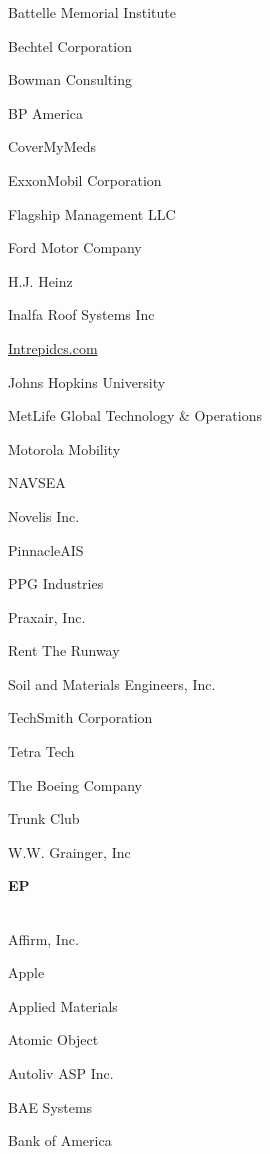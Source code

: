 \documentclass[twoside]{article}
\begin{document}
\begin{center}
\begin{multicols}{5}
\begin{FlushLeft}
\begin{compactitem}
\item Battelle Memorial Institute
\item Bechtel Corporation
\item Bowman Consulting
\item BP America
\item CoverMyMeds
\item ExxonMobil Corporation
\item Flagship Management LLC
\item Ford Motor Company
\item H.J. Heinz
\item Inalfa Roof Systems Inc
\item \url{Intrepidcs.com}
\item Johns Hopkins University
\item MetLife Global Technology \& Operations
\item Motorola Mobility
\item NAVSEA
\item Novelis Inc.
\item PinnacleAIS
\item PPG Industries
\item Praxair, Inc.
\item Rent The Runway
\item Soil and Materials Engineers, Inc.
\item TechSmith Corporation
\item Tetra Tech
\item The Boeing Company
\item Trunk Club
\item W.W. Grainger, Inc
\end{compactitem}
        \end{FlushLeft}
        \vspace{1em}
        {\fontsize{14}{16}\selectfont \bf EP}\\
        \vspace{-1em}
        ~\hrulefill~
        \vspace{-.9em}
        \begin{FlushLeft}
        \begin{compactitem}
        \item Affirm, Inc.
\item Apple
\item Applied Materials
\item Atomic Object
\item Autoliv ASP Inc.
\item BAE Systems
\item Bank of America

\end{compactitem}
\end{FlushLeft}
\end{multicols}
\end{center}
\end{document}
